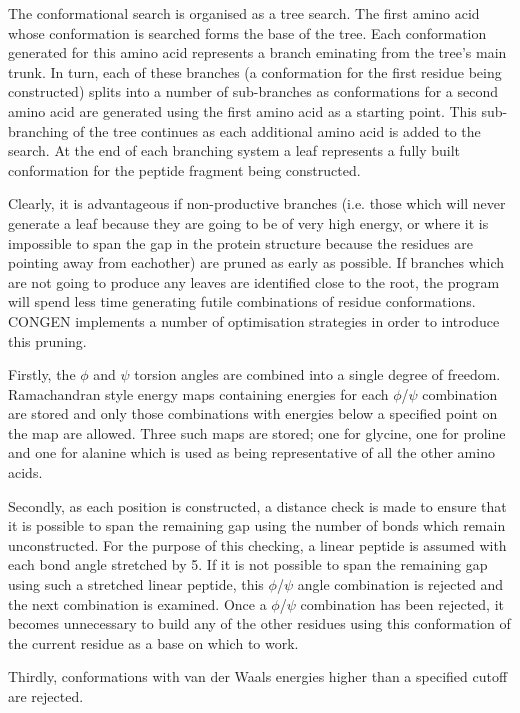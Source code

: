 The conformational search is organised as a tree search. 
The first amino acid whose conformation is searched forms the base of the
tree. Each conformation generated for this amino acid represents a branch
eminating from the tree's main trunk. In turn, each of these branches
(a conformation for the first residue being constructed) splits into a
number of sub-branches as conformations for a second amino acid are
generated using the first amino acid as a starting point. This
sub-branching of the tree continues as each additional amino acid
is added to the search. At the end of each branching system a leaf
represents a fully built conformation for the peptide fragment 
being constructed.

Clearly, it is advantageous if non-productive branches (i.e. those
which will never generate a leaf because they are going to be of very 
high energy, or where it is impossible
to span the gap in the protein structure because the residues are
pointing away from eachother) are pruned as early as possible. 
If branches which are not going to produce any leaves are identified close to 
the root, the program will spend less time generating futile combinations
of residue conformations.
CONGEN implements a number of optimisation strategies in order to
introduce this pruning.

Firstly, the $\phi$ and $\psi$ torsion angles are combined into a
single degree of freedom. Ramachandran style energy maps containing
energies for each $\phi$/$\psi$ combination are stored and only those
combinations with energies below a specified point on the map are allowed.
Three such maps are stored; one for glycine, one for proline and one for
alanine which is used as being representative of all the other amino
acids.

Secondly, as each position is constructed, a distance check is made to
ensure that it is possible to span the remaining gap using the number
of bonds which remain unconstructed. For the purpose of this checking,
a linear peptide is assumed with each bond angle stretched by 5\degree.
If it is not possible to span
the remaining gap using such a stretched linear peptide, this 
$\phi$/$\psi$ angle combination is rejected and the next combination
is examined. Once a $\phi$/$\psi$
combination has been rejected, it becomes unnecessary to build any
of the other residues using this conformation of the current residue
as a base on which to work.

Thirdly, conformations with van der Waals energies higher than a 
specified cutoff are rejected.

